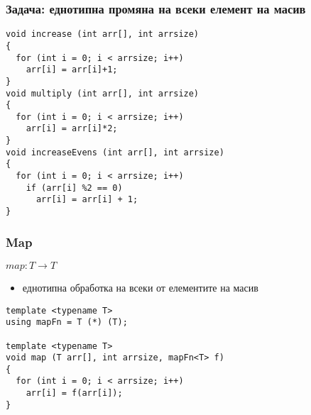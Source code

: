 \documentclass{beamer}
\begin{document}
\begin{frame}[fragile]
\frametitle{Задача: еднотипна промяна на всеки елемент на масив}

\begin{flushleft}
\begin{lstlisting}
void increase (int arr[], int arrsize)
{
  for (int i = 0; i < arrsize; i++)
    arr[i] = arr[i]+1;
}
void multiply (int arr[], int arrsize)
{
  for (int i = 0; i < arrsize; i++)
    arr[i] = arr[i]*2;
}
void increaseEvens (int arr[], int arrsize)
{
  for (int i = 0; i < arrsize; i++)
    if (arr[i] %2 == 0)
      arr[i] = arr[i] + 1;
}
\end{lstlisting}  
\end{flushleft}

  
\end{frame}


\begin{frame}[fragile]
\frametitle{Map}

\begin{center}
$map: T \rightarrow T$
\end{center}

\begin{itemize}
  \item еднотипна обработка на всеки от елементите на масив
\end{itemize}

\begin{flushleft}
\begin{lstlisting}
template <typename T>
using mapFn = T (*) (T);

template <typename T>
void map (T arr[], int arrsize, mapFn<T> f)
{
  for (int i = 0; i < arrsize; i++)
    arr[i] = f(arr[i]);
}
\end{lstlisting}  
\end{flushleft}

  
\end{frame}
\end{document}
